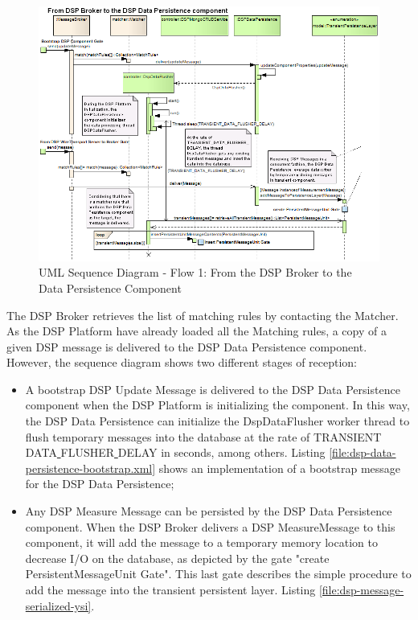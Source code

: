 \begin{figure}[!b]
  \centering
  \includegraphics[scale=0.5]{../diagrams/From-DSP-Broker-To-DSPDataPersistence-General-Sequence}
  \caption{UML Sequence Diagram - Flow 1: From the DSP Broker to the Data
  Persistence Component}
  \label{fig:From-DSP-Broker-To-DSPDataPersistence-General-Sequence}
\end{figure}

The DSP Broker retrieves the list of matching rules by contacting the Matcher.
As the DSP Platform have already loaded all the Matching rules, a copy of a
given DSP message is delivered to the DSP Data Persistence component. However,
the sequence diagram shows two different stages of reception:

\begin{itemize}
  \item A bootstrap DSP Update Message is delivered to the DSP Data Persistence
  component when the DSP Platform is initializing the component. In this way,
  the DSP Data Persistence can initialize the DspDataFlusher worker thread to
  flush temporary messages into the database at the rate of
  TRANSIENT\underline{ }DATA\underline{ }FLUSHER\underline{ }DELAY in seconds,
  among others. Listing \ref{file:dsp-data-persistence-bootstrap.xml} shows an
  implementation of a bootstrap message for the DSP Data Persistence;
  \item Any DSP Measure Message can be persisted by the DSP Data Persistence
  component. When the DSP Broker delivers a DSP MeasureMessage to this
  component, it will add the message to a temporary memory location to decrease
  I/O on the database, as depicted by the gate "create PersistentMessageUnit
  Gate". This last gate describes the simple procedure to add the message
  into the transient persistent layer. Listing
  \ref{file:dsp-message-serialized-ysi}.
\end{itemize}

